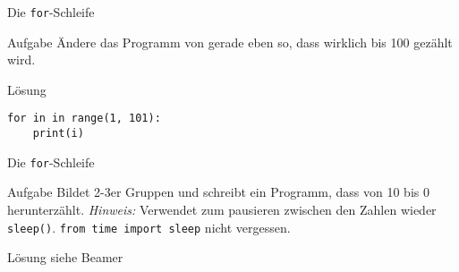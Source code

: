 \begin{frame}[fragile]{Die \texttt{for}-Schleife}
\begin{block}{Aufgabe}
Ändere das Programm von gerade eben so, dass wirklich bis 100 gezählt wird.
\end{block}
\pause{}
\begin{exampleblock}{Lösung}
\begin{lstlisting}
for in in range(1, 101):
    print(i)
\end{lstlisting}
\end{exampleblock}
\end{frame}

\begin{frame}[fragile]{Die \texttt{for}-Schleife}
\begin{block}{Aufgabe}
Bildet 2-3er Gruppen und schreibt ein Programm, dass von 10 bis 0 herunterzählt.
\textit{Hinweis:} Verwendet zum pausieren zwischen den Zahlen wieder \texttt{sleep()}.
\lstinline{from time import sleep} nicht vergessen.
\end{block}
\pause{}
\begin{exampleblock}{Lösung}
    siehe Beamer
\end{exampleblock}
\end{frame}

